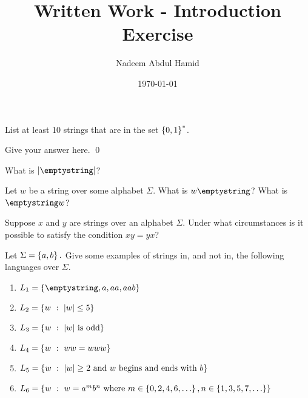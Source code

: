 \documentclass[10pt]{article}
\title{Written Work - Introduction Exercise} 	%
\author{Nadeem Abdul Hamid}      			%
\date{\today}							%
\begin{document}
\maketitle

\begin{exersoln}{5}   %
	List at least 10 strings that are in the set $\left\lbrace 0, 1 \right\rbrace^{*}$.
	
	\answer    %
	Give your answer here.
	\qed		%
\end{exersoln}

\begin{exersoln}{7}
	What is $|\emptystring|$?
	
	\answer
\end{exersoln}

\begin{exersoln}{10}
	Let $w$ be a string over some alphabet $\Sigma$. What is $w\emptystring$? What is $\emptystring w$?
	
	\answer
\end{exersoln}

\begin{exersoln}{11}
	Suppose $x$ and $y$ are strings over an alphabet $\Sigma$. Under what circumstances is it possible to satisfy the condition $xy = yx$? 
	
	\answer
\end{exersoln}

\begin{exersoln}{13}
	Let $\Sigma = \left\lbrace a, b \right\rbrace.$ Give some examples of strings in, and not in, the following languages over $\Sigma$.
	\begin{enumerate}[label=(\alph*)]
	\item $L_1 = \setdef{ \emptystring, a, aa, aab }$
		\answer
	\item $L_2 = \left\lbrace w\ :\ |w| \leq 5 \right\rbrace$
		\answer
	\item $L_3 = \left\lbrace w\ :\ |w|~\textrm{is odd} \right\rbrace$
		\answer
	\item $L_4 = \left\lbrace w\ :\ ww = www \right\rbrace$
		\answer
	\item $L_5 = \left\lbrace w\ :\ |w| \geq 2 ~\textrm{and $w$ begins and ends with $b$} \right\rbrace$
		\answer
	\item $L_6 = \left\lbrace w\ :\ w = a^m b^n ~\textrm{where}~ m \in \left\lbrace 0, 2, 4, 6, \ldots \right\rbrace, n \in \left\lbrace 1, 3, 5, 7, \ldots \right\rbrace \right\rbrace$
		\answer
	\end{enumerate}
\end{exersoln}
\end{document}
